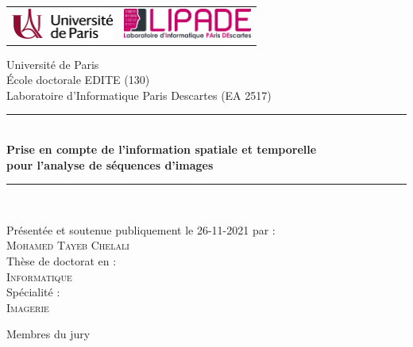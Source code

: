 \documentclass[12pt]{book}
\newcommand{\HRule}{\rule{\linewidth}{0.7mm}}
\newcommand{\Hrule}{\rule{\linewidth}{0.3mm}}
\begin{document}
	
	\begin{titlepage}
		\begin{center}
			\begin{tabular}{c@{\hskip 3cm}c}
				\includegraphics[height=1cm]{images/Universite_Paris_logo_horizontal_2000px.png} &
				\includegraphics[height=1cm]{images/LIPADE.png}\\
			\end{tabular}
		\end{center}
	
		
		\begin{center}
			{%
				Université de Paris\\
				École doctorale EDITE (130)\\
				Laboratoire d’Informatique Paris Descartes (EA 2517)
			}
			
			\vfill
			
			\HRule \\[0.1cm]
			{ \Large \bfseries Prise en compte de l'information spatiale et temporelle\\[0.05cm]pour l'analyse de séquences d'images }
			\Hrule \\
		\end{center}
		
		\vfill
		
		\begin{center}
			Présentée et soutenue publiquement le 26-11-2021 par :\\[0.3cm] 
			\textsc{\large Mohamed Tayeb Chelali}\\[1.5cm] 
			
			Thèse de doctorat en :\\[0.2cm]
			\textsc{\large Informatique }\\[.5cm]
			
			Spécialité :\\[0.2cm]
			\textsc{\large Imagerie}\\[1cm]
		\end{center}
		
		\vspace{1.5cm}
		
		
		\begin{center}
			Membres du jury\\[0.2cm]
			

\end{center}
\end{titlepage}
\end{document}
